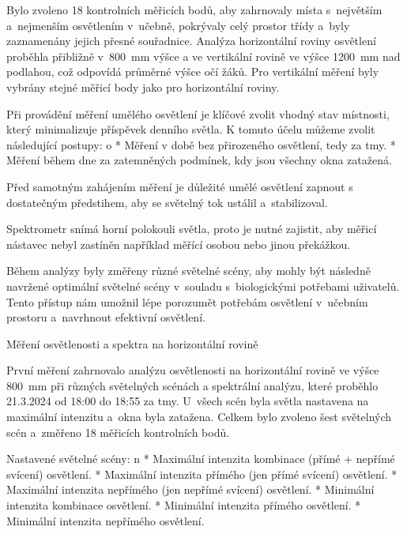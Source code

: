 Bylo zvoleno 18 kontrolních měřicích bodů, aby zahrnovaly místa s~největším a~nejmenším osvětlením
v~učebně, pokrývaly celý prostor třídy a~byly zaznamenány jejich přesné souřadnice.
Analýza horizontální roviny osvětlení proběhla přibližně v~800~mm výšce a ve vertikální
rovině ve výšce 1200~mm nad podlahou, což odpovídá průměrné výšce očí žáků.
Pro vertikální měření byly vybrány stejné měřicí body jako pro horizontální roviny.

Při provádění měření umělého osvětlení je klíčové zvolit vhodný stav místnosti,
který minimalizuje příspěvek denního světla. K tomuto účelu můžeme zvolit následující postupy:
\begitems \style o
    * Měření v době bez přirozeného osvětlení, tedy za tmy.
    * Měření během dne za zatemněných podmínek, kdy jsou všechny okna zatažená.
\enditems

Před samotným zahájením měření je důležité umělé osvětlení zapnout s dostatečným předstihem,
aby se světelný tok ustálil a~stabilizoval.


Spektrometr snímá horní polokouli světla, proto je nutné zajistit, aby měřicí nástavec nebyl zastíněn
například měřící osobou nebo jinou překážkou.



Během analýzy byly změřeny různé světelné scény, aby mohly být následně navržené optimální světelné scény
v~souladu s~biologickými potřebami uživatelů. Tento přístup nám umožnil lépe porozumět potřebám osvětlení
v~učebním prostoru a~navrhnout efektivní osvětlení.%

\sec Měření osvětlenosti a spektra na horizontální rovině

První měření zahrnovalo analýzu osvětlenosti na horizontální rovině ve výšce 800~mm
při různých světelných scénách a spektrální analýzu,
které proběhlo 21.3.2024 od 18:00 do 18:55 za tmy.
U~všech scén byla světla nastavena na maximální intenzitu a~okna byla zatažena.
Celkem bylo zvoleno šest světelných scén a~změřeno 18 měřicích kontrolních bodů.

\medskip\noindent
{\sbf Nastavené světelné scény:}
\begitems \style n
    * Maximální intenzita kombinace (přímé + nepřímé svícení) osvětlení.
    * Maximální intenzita přímého (jen přímé svícení) osvětlení.
    * Maximální intenzita nepřímého (jen nepřímé svícení) osvětlení.
    * Minimální intenzita kombinace osvětlení.
    * Minimální intenzita přímého osvětlení.
    * Minimální intenzita nepřímého osvětlení.
\enditems


